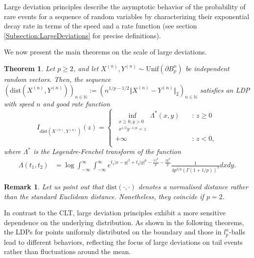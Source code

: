 \documentclass[10pt]{amsart}
\newtheorem{theorem}{Theorem}[section]
\newtheorem{rmk}{Remark}[section]
\newcounter{theor}
\def\N{\mathbb{N}}
\def\dist{\text{dist}}
\numberwithin{equation}{section}
\begin{document}
Large deviation principles describe the asymptotic behavior of the probability of rare events for a sequence of random variables by characterizing their exponential decay rate in terms of the speed and a rate function (see section \ref{Subsection:LargeDeviations} for precise definitions).

We now present the main theorems on the scale of large deviations.

\begin{theorem}
\label{ThmLDPBoundarypgeq2}
Let $p\geq 2$, and let $X^{(n)} , Y^{(n)} \sim \text{Unif} ( \partial B_p^n)$ be independent random vectors. Then, the sequence $\left( \dist (X^{(n)} , Y^{(n)}) \right)_{n \in \N} := \left( n^{1/p - 1/2} \Vert X^{(n)} - Y^{(n)} \Vert _2 \right)_{n \in \N}$ satisfies an LDP with speed $n$ and good rate function
\[   
I_{\dist (X^{(n)} , Y^{(n)})}(z) = 
     \begin{cases}
       \displaystyle{\inf_{ \substack{x \geq 0, y > 0 \\ x^{1/2}y^{-1/p} = z}} \Lambda ^* (x,y)}  &\quad\text{: }z \geq 0\\
       + \infty &\quad\text{: }z < 0, \\ 
     \end{cases}
\]
where $ \Lambda^* $ is the Legendre-Fenchel transform of the function
\begin{align*}
\Lambda (t_1,t_2) & = \log \int _{-\infty} ^{\infty} \int _{-\infty} ^{\infty} e^{t_1 |x-y|^2 + t_2|y|^p    
  - \frac{|x|^p}{p} - \frac{|y|^p}{p} } \frac{1}{4p^{2/p} \left( \Gamma(1 + 1/p) \right)^2} dx dy .
\end{align*}
\end{theorem}

\begin{rmk}
Let us point out that $\dist (\cdot , \cdot)$ denotes a normalised distance rather than the standard Euclidean distance. Nonetheless, they coincide if $p=2$.
\end{rmk}

In contrast to the CLT, large deviation principles exhibit a more sensitive dependence on the underlying distribution. As shown in the following theorems, the LDPs for points uniformly distributed on the boundary and those in $l_p^n$-balls lead to different behaviors, reflecting the focus of large deviations on tail events rather than fluctuations around the mean.
\end{document}
